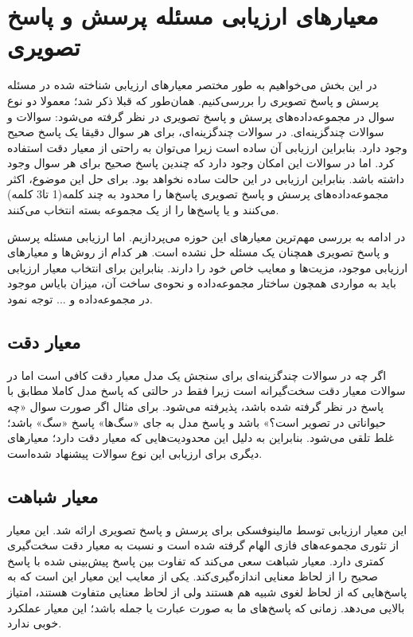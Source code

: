 \section{معیارهای ارزیابی مسئله پرسش و پاسخ تصویری}
{
در این بخش می‌خواهیم به طور مختصر معیارهای ارزیابی شناخته شده در مسئله پرسش و پاسخ تصویری را بررسی‌کنیم. همان‌طور که قبلا ذکر شد؛ معمولا دو نوع سوال در مجموعه‌داده‌های پرسش و پاسخ تصویری در نظر گرفته می‌شود: سوالات 
و سوالات چندگزینه‌ای. در سوالات چندگزینه‌ای، برای هر سوال دقیقا یک پاسخ صحیح وجود دارد. بنابراین ارزیابی آن ساده است زیرا می‌توان به راحتی از معیار دقت استفاده کرد. اما در سوالات
این امکان وجود دارد که چندین پاسخ صحیح برای هر سوال وجود داشته باشد. بنابراین ارزیابی در این حالت ساده نخواهد بود. برای حل این موضوع، اکثر مجموعه‌داده‌های پرسش و پاسخ تصویری پاسخ‌ها را محدود به چند کلمه(1 تا3 کلمه) می‌کنند و یا پاسخ‌ها را از یک مجموعه بسته انتخاب می‌کنند.

 در ادامه به بررسی  مهم‌ترین معیارهای این حوزه می‌پردازیم. اما ارزیابی مسئله پرسش و پاسخ تصویری همچنان یک مسئله حل نشده است. هر کدام از روش‌ها و معیارهای ارزیابی موجود، مزیت‌ها و معایب خاص خود را دارند. بنابراین برای انتخاب معیار ارزیابی باید به مواردی همچون ساختار مجموعه‌داده و نحوه‌ی ساخت آن، میزان بایاس موجود در مجموعه‌داده و ... توجه نمود. 

	\subsection{معیار دقت}
	{
		اگر چه در سوالات چندگزینه‌ای برای سنجش یک مدل معیار دقت کافی است اما در سوالات 
		معیار دقت سخت‌گیرانه است زیرا فقط در حالتی که پاسخ مدل کاملا مطابق با پاسخ در نظر گرفته شده باشد، پذیرفته می‌‌شود. برای مثال اگر صورت سوال «چه حیواناتی در تصویر است؟» باشد و پاسخ مدل به جای «سگ‌ها‌» پاسخ «سگ» باشد؛ غلط تلقی می‌شود. بنابراین به دلیل این محدودیت‌هایی که معیار دقت دارد؛ معیارهای دیگری برای ارزیابی این نوع سوالات پیشنهاد‌ شده‌است.
	}
	
	\subsection{معیار شباهت }
	{
	این معیار ارزیابی توسط مالینوفسکی برای پرسش و پاسخ تصویری ارائه شد. این معیار از تئوری مجموعه‌های فازی الهام گرفته شده است و نسبت به معیار دقت سخت‌گیری کمتری دارد. معیار شباهت 
	سعی می‌کند که تفاوت بین پاسخ پیش‌بینی شده با پاسخ صحیح  را از لحاظ معنایی اندازه‌گیری‌کند. یکی از معایب این معیار این است که به پاسخ‌هایی که از لحاظ لغوی شبیه هم هستند ولی از لحاظ معنایی متفاوت هستند، امتیاز بالایی می‌دهد. زمانی که پاسخ‌های ما به صورت عبارت یا جمله باشد؛ این  معیار عملکرد خوبی ندارد. 
	}

}
